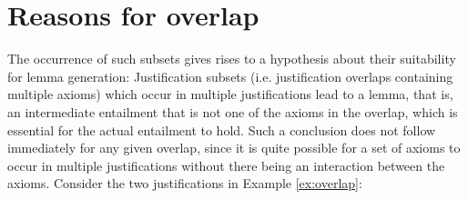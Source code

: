 






\section*{Reasons for overlap}
The occurrence of such subsets gives rises to a hypothesis about their suitability for lemma generation: Justification subsets (i.e. justification overlaps containing multiple axioms) which occur in multiple justifications lead to a lemma, that is, an intermediate entailment that is not one of the axioms in the overlap, which is essential for the actual entailment to hold. Such a conclusion does not follow immediately for any given overlap, since it is quite possible for a set of axioms to occur in multiple justifications without there being an interaction between the axioms. Consider the two justifications in Example \ref{ex:overlap}:

